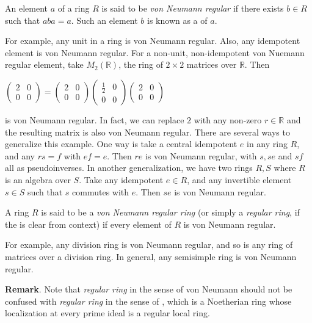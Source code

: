 \documentclass[12pt]{article}
\begin{document}
An element $a$ of a ring $R$ is said to be \emph{von Neumann regular} if there
exists $b\in R$ such that $aba=a$. Such an element $b$ is known as a \emph{} of $a$.  

For example, any unit in a ring is von Neumann regular.  Also, any idempotent element is von Neumann regular.  For a non-unit, non-idempotent von Nuemann regular element, take $M_2(\mathbb{R})$, the ring of $2\times 2$ matrices over $\mathbb{R}$.  Then  
\begin{center}
$\begin{pmatrix}
2 & 0 \\
0 & 0
\end{pmatrix}=
\begin{pmatrix}
2 & 0 \\
0 & 0
\end{pmatrix}
\begin{pmatrix}
\frac{1}{2} & 0 \\
0 & 0
\end{pmatrix}
\begin{pmatrix}
2 & 0 \\
0 & 0
\end{pmatrix}$
\end{center}
is von Neumann regular.  In fact, we can replace $2$ with any non-zero $r\in \mathbb{R}$ and the resulting matrix is also von Neumann regular.  There are several ways to generalize this example.  One way is take a central idempotent $e$ in any ring $R$, and any $rs=f$ with $ef=e$.  Then $re$ is von Neumann regular, with $s,se$ and $sf$ all as pseudoinverses.  In another generalization, we have two rings $R,S$ where $R$ is an algebra over $S$.  Take any idempotent $e\in R$, and any invertible element $s\in S$ such that $s$ commutes with $e$.  Then $se$ is von Neumann regular.

A ring $R$ is said to be a \emph{von Neumann regular ring} (or simply
a \emph{regular ring}, if the  is clear from context)
if every element of $R$ is von Neumann regular.

For example, any division ring is von Neumann regular, and so is any ring of matrices over a division ring.  In general, any semisimple ring is von Neumann regular.

\textbf{Remark}.  Note that \emph{regular ring} in the sense of von Neumann should not be confused with \emph{regular ring} in the sense of , which is a Noetherian ring whose localization at every prime ideal is a regular local ring.
\end{document}
